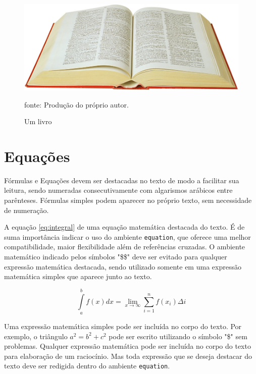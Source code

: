 \documentclass[
  12pt,		%
  a4paper,	%
  openright,%
  oneside,	%
  chapter=TITLE,		%
  section=TITLE,		%
  english,	%
  french,	%
  spanish,	%
  brazil
]{abntex2}
\begin{document}
                \begin{figure}[h]
                    \centering
                    \caption{Um livro}
                    \includegraphics{book}
                    \par
                    {\small fonte: Produção do próprio autor.}
                \end{figure}
    
    \chapter {Equações}
        
        Fórmulas e Equações devem ser destacadas no texto de modo a facilitar sua leitura, sendo numeradas consecutivamente com algarismos arábicos entre parênteses. Fórmulas simples podem aparecer no próprio texto, sem necessidade de numeração.
        
        A equação \ref{eq:integral} de uma equação matemática destacada do texto. É de suma importância indicar o uso do ambiente \verb|equation|, que oferece uma melhor compatibilidade, maior flexibilidade além de referências cruzadas. O ambiente matemático indicado pelos símbolos "\$\$" deve ser evitado para qualquer expressão matemática destacada, sendo utilizado somente em uma expressão matemática simples que aparece junto ao texto.
        
        \begin{equation}
            \label{eq:integral}
            \int\limits_a^b f(x) dx = \lim_{x \to \infty} \displaystyle\sum_{i=1}^{n} f(x_i) \Delta i
        \end{equation}

        Uma expressão matemática simples pode ser incluída no corpo do texto. Por exemplo, o triângulo $a^2 = b^2 + c^2$ pode ser escrito utilizando o símbolo "\$" sem problemas. Qualquer expressão matemática pode ser incluída no corpo do texto para elaboração de um raciocínio. Mas toda expressão que se deseja destacar do texto deve ser redigida dentro do ambiente \verb|equation|.
    
\end{document}
